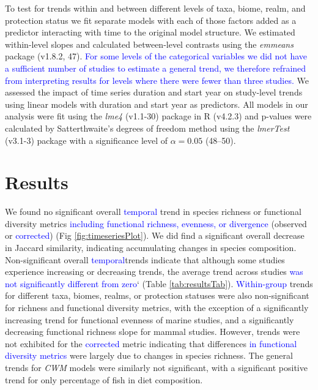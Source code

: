 \documentclass{article}
\begin{document}
To test for trends within and between different levels of taxa, biome,
realm, and protection status we fit separate models with each of those
factors added as a predictor interacting with time to the original model
structure. We estimated within-level slopes and calculated between-level
contrasts using the \emph{emmeans} package (v1.8.2, 47).
\textcolor{blue}{For some levels of the categorical variables we did not have a sufficient number of studies to estimate a general trend, we therefore refrained from interpreting results for levels where there were fewer than three studies.}
We assessed the impact of time series duration and start year on
study-level trends using linear models with duration and start year as
predictors. All models in our analysis were fit using the \emph{lme4}
(v1.1-30) package in R (v4.2.3) and p-values were calculated by
Satterthwaite's degrees of freedom method using the \emph{lmerTest}
(v3.1-3) package with a significance level of \(\alpha = 0.05\)
(48--50).

\hypertarget{results}{%
\section{Results}\label{results}}

We found no significant overall \textcolor{blue}{temporal} trend in
species richness or functional diversity metrics
\textcolor{blue}{including functional richness, evenness, or divergence}
(observed or \textcolor{blue}{corrected}) (Fig
\ref{fig:timeseriesPlot}). We did find a significant overall decrease in
Jaccard similarity, indicating accumulating changes in species
composition. Non-significant overall \textcolor{blue}{temporal}trends
indicate that although some studies experience increasing or decreasing
trends, the average trend across studies
\textcolor{blue}{was not significantly different from zero}` (Table
\ref{tab:resultsTab}). \textcolor{blue}{Within-group} trends for
different taxa, biomes, realms, or protection statuses were also
non-significant for richness and functional diversity metrics, with the
exception of a significantly increasing trend for functional evenness of
marine studies, and a significantly decreasing functional richness slope
for mammal studies. However, trends were not exhibited for the
\textcolor{blue}{corrected} metric indicating that differences
\textcolor{blue}{in functional diversity metrics} were largely due to
changes in species richness. The general trends for \emph{CWM} models
were similarly not significant, with a significant positive trend for
only percentage of fish in diet composition.
\end{document}
